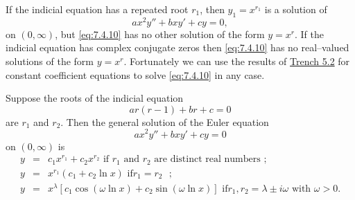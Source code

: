 \documentclass{ximera}
\begin{document}
If the indicial equation  has a repeated root $r_1$, then
$y_1=x^{r_1}$ is a solution of
\begin{equation} \label{eq:7.4.10}
ax^2y''+bxy'+cy=0,
\end{equation}
on $(0,\infty)$, but \eqref{eq:7.4.10} has no other solution of the form
$y=x^r$. If the indicial equation has complex conjugate zeros then
\eqref{eq:7.4.10} has no real--valued solutions of the form $y=x^r$.
Fortunately we can use the results of 
\href{https://ximera.osu.edu/ode/main/constantCoefficientHomogeneousEquations/constantCoefficientHomogeneousEquations}{Trench 5.2} 
for constant coefficient equations to solve \eqref{eq:7.4.10} in any case.

\begin{theorem}\label{thmtype:7.4.3}
Suppose the roots of the indicial equation
\begin{equation}
\label{eq:7.4.11} ar(r-1)+br+c=0
\end{equation}
are $r_1$ and $r_2$. Then the general solution of the Euler equation
\begin{equation} \label{eq:7.4.12}
ax^2y''+bxy'+cy=0
\end{equation}
 on  $(0,\infty)$ is
\begin{eqnarray*}
y&=&c_1x^{r_1}+c_2x^{r_2}\mbox{ if $r_1$ and $r_2$ are distinct
real numbers  };
\\ y&=&x^{r_1}(c_1+c_2\ln x)\mbox{ if
$r_1=r_2$  };
\\ y&=&x^{\lambda}\left[c_1\cos\left(\omega\ln x\right)+
c_2\sin\left(\omega\ln x \right)\right]\mbox{ if
$r_1,r_2=\lambda\pm i\omega$ with $\omega>0$}.
\end{eqnarray*}
\end{theorem}
\end{document}
